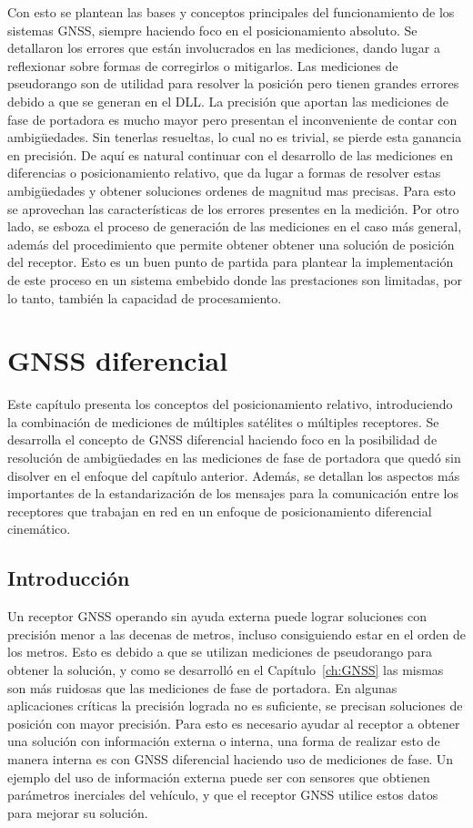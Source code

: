 \documentclass[a4paper,12pt,oneside,onecolumn,final,openright]{book}%
\begin{document}
	Con esto se plantean las bases y conceptos principales del funcionamiento de los sistemas GNSS, siempre haciendo foco en el posicionamiento absoluto. Se detallaron los errores que están involucrados en las mediciones, dando lugar a reflexionar sobre formas de corregirlos o mitigarlos. Las mediciones de pseudorango son de utilidad para resolver la posición pero tienen grandes errores debido a que se generan en el DLL. La precisión que aportan las mediciones de fase de portadora es mucho mayor pero presentan el inconveniente de contar con ambigüedades. Sin tenerlas resueltas, lo cual no es trivial, se pierde esta ganancia en precisión. De aquí es natural continuar con el desarrollo de las mediciones en diferencias o posicionamiento relativo, que da lugar a formas de resolver estas ambigüedades y obtener soluciones ordenes de magnitud mas precisas. Para esto se aprovechan las características de los errores presentes en la medición. Por otro lado, se esboza el proceso de generación de las mediciones en el caso más general, además del procedimiento que permite obtener obtener una solución de posición del receptor. Esto es un buen punto de partida para plantear la implementación de este proceso en un sistema embebido donde las prestaciones son limitadas, por lo tanto, también la capacidad de procesamiento.

\chapter{GNSS diferencial}\label{ch:DGNSS}
	Este capítulo presenta los conceptos del posicionamiento relativo, introduciendo la combinación de mediciones de múltiples satélites o múltiples receptores. Se desarrolla el concepto de GNSS diferencial haciendo foco en la posibilidad de resolución de ambigüedades en las mediciones de fase de portadora que quedó sin disolver en el enfoque del capítulo anterior. Además, se detallan los aspectos más importantes de la estandarización de los mensajes para la comunicación entre los receptores que trabajan en red en un enfoque de posicionamiento diferencial cinemático.
\section{Introducción}
	Un receptor GNSS operando sin ayuda externa puede lograr soluciones con precisión menor a las decenas de metros, incluso consiguiendo estar en el orden de los metros. Esto es debido a que se utilizan mediciones de pseudorango para obtener la solución, y como se desarrolló en el Capítulo~\ref{ch:GNSS} las mismas son más ruidosas que las mediciones de fase de portadora. En algunas aplicaciones críticas la precisión lograda no es suficiente, se precisan soluciones de posición con mayor precisión.  Para esto es necesario ayudar al receptor a obtener una solución con información externa o interna, una forma de realizar esto de manera interna es con GNSS diferencial haciendo uso de mediciones de fase. Un ejemplo del uso de información externa puede ser con sensores que obtienen parámetros inerciales del vehículo, y que el receptor GNSS utilice estos datos para mejorar su solución.
	
\end{document}
